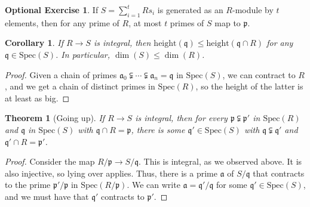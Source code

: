 \documentclass{amsart}[12pt]
\newcommand{\p}{{\mathfrak p}}
\newcommand{\q}{{\mathfrak q}}
\numberwithin{equation}{section}
\theoremstyle{plain} %
\newtheorem{theorem}[equation]{Theorem}
\newtheorem{corollary}[equation]{Corollary}
\theoremstyle{definition}
\newtheorem{exer}[equation]{Optional Exercise}
\theoremstyle{remark}
\newcommand{\Spec}{\mathrm{Spec}}
\begin{document}
\begin{exer}  If $S=\sum_{i=1}^t R s_i$ is generated as an  $R$-module by $t$ elements, then for any prime of $R$, at most $t$ primes of $S$ map to $\p$.
\end{exer}


\begin{corollary} If $R\to S$ is integral, then $\mathrm{height}(\q) \leq \mathrm{height}(\q \cap R)$ for any $\q\in \Spec(S)$. In particular, $\dim(S) \leq \dim(R)$.
\end{corollary}
\begin{proof}
	Given a chain of primes $\mathfrak{a}_0 \subsetneqq \cdots \subsetneqq \mathfrak{a}_n = \q$ in $\Spec(S)$, we can contract to $R$, and we get a chain of distinct primes in $\Spec(R)$, so the height of the latter is at least as big.
\end{proof}


\begin{theorem}[Going up]
	If $R\to S$ is integral, then for every $\p \subsetneqq \p'$ in $\Spec(R)$ and $\q$ in $\Spec(S)$ with $\q \cap R=\p$, there is some $\q'\in \Spec(S)$ with $\q \subsetneqq \q'$ and $\q' \cap R = \p'$.
\end{theorem}
\begin{proof} Consider the map $R/\p \to S/\q$. This is integral, as we observed above. It is also injective, so lying over applies. Thus, there is a prime $\mathfrak{a}$ of $S/\q$ that contracts to the prime $\p'/\p$ in $\Spec(R/\p)$. We can write $\mathfrak{a}=\q'/\q$ for some $\q'\in \Spec(S)$, and we must have that $\q'$ contracts to $\p'$.
\end{proof}
\end{document}

